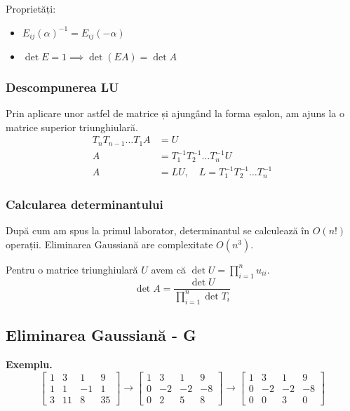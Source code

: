 \documentclass{exam}
\begin{document}
Proprietăți:
\begin{itemize}
	\item $E_{ij}(\alpha)^{-1} = E_{ij}(-\alpha)$
	\item $\det E = 1 \implies \det (EA) = \det A$
\end{itemize}

\subsubsection{Descompunerea LU}

Prin aplicare unor astfel de matrice și ajungând la forma eșalon, am ajuns
la o matrice superior triunghiulară.
\begin{align*}
	T_nT_{n-1}\ldots T_1 A & = U                                             \\
	A                      & = T_1^{-1}T_2^{-1}\ldots T_n^{-1}U              \\
	A                      & = LU, \quad L = T_1^{-1}T_2^{-1}\ldots T_n^{-1}
\end{align*}

\subsubsection{Calcularea determinantului}

După cum am spus la primul laborator, determinantul se calculează în $O(n!)$
operații. Eliminarea Gaussiană are complexitate $O(n^3)$.

Pentru o matrice triunghiulară $U$ avem că $\det U = \prod_{i=1}^{n} u_{ii}$.
\begin{equation*}
	\det A = \frac{\det U}{\prod_{i = 1}^{n} \det T_i}
\end{equation*}

\subsection{Eliminarea Gaussiană - G}

\textbf{Exemplu.}
\begin{equation*}
	\begin{bmatrix}
		1 & 3  & 1  & 9  \\
		1 & 1  & -1 & 1  \\
		3 & 11 & 8  & 35
	\end{bmatrix} \to
	\begin{bmatrix}
		1 & 3  & 1  & 9  \\
		0 & -2 & -2 & -8 \\
		0 & 2  & 5  & 8
	\end{bmatrix} \to
	\begin{bmatrix}
		1 & 3  & 1  & 9  \\
		0 & -2 & -2 & -8 \\
		0 & 0  & 3  & 0
	\end{bmatrix}
\end{equation*}
\end{document}
